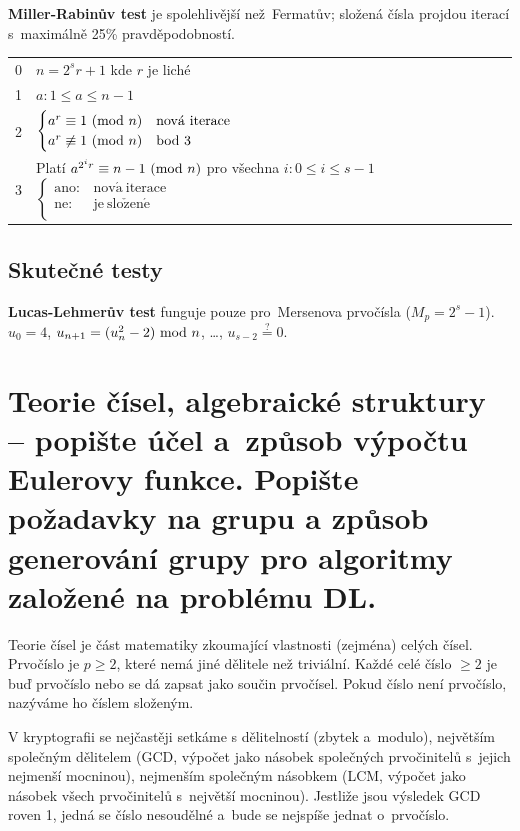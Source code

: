 \noindent \textbf{Miller-Rabinův test} je spolehlivější než~Fermatův; složená čísla projdou iterací s~maximálně 25\% pravděpodobností.

\begin{table}[ht]
\begin{tabular}{l|l}
0 & $n = 2^s r + 1$ kde $r$ je liché \\
1 & $a: 1 \leq a \leq n-1$ \\
2 & $\begin{cases}
a^r \equiv 1 \ (\mathrm{mod}\ n) & \mathrm{nov\acute{a}\ iterace} \\
a^r \not\equiv 1 \ (\mathrm{mod}\ n) & \mathrm{bod\ 3} \\
\end{cases}$ \\
3 & Platí $a^{2^i r} \equiv n-1 \ (\mathrm{mod}\ n)$ pro všechna $i: 0 \leq i \leq s-1$ $\begin{cases}
\mathrm{ano:} & \mathrm{nov\acute{a}\ iterace} \\
\mathrm{ne:} & \mathrm{je\ slo\check{z}en\acute{e}} \\
\end{cases}$ \\
\end{tabular}
\end{table}

\subsection{Skutečné testy}

\textbf{Lucas-Lehmerův test} funguje pouze pro~Mersenova prvočísla ($M_p = 2^s - 1$). \\
$u_0 = 4$, $u_{n+1} = (u_n^2 - 2) \ \mathrm{mod}\ n$, \dots, $u_{s-2} \stackrel{?}{=} 0$.

\clearpage
\section{Teorie čísel, algebraické struktury -- popište účel a~způsob výpočtu Eulerovy funkce. Popište požadavky na grupu a způsob generování grupy pro algoritmy založené na problému DL.}

Teorie čísel je část matematiky zkoumající vlastnosti (zejména) celých čísel. Prvočíslo je $p \geq 2$, které nemá jiné dělitele než triviální. Každé celé číslo $\geq 2$ je buď prvočíslo nebo se dá zapsat jako součin prvočísel. Pokud číslo není prvočíslo, nazýváme ho číslem složeným.

V kryptografii se nejčastěji setkáme s dělitelností (zbytek a~modulo), největším společným dělitelem (GCD, výpočet jako násobek společných prvočinitelů s~jejich nejmenší mocninou), nejmenším společným násobkem (LCM, výpočet jako násobek všech prvočinitelů s~největší mocninou). Jestliže jsou výsledek GCD roven 1, jedná se číslo nesoudělné a~bude se nejspíše jednat o~prvočíslo.


